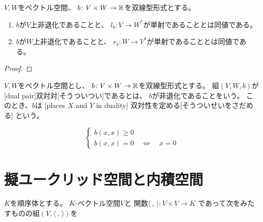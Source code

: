 \documentclass[report]{jlreq}
\begin{document}
\begin{proposition}[非退化性の特徴付け]
    $V, W$をベクトル空間、
    $b \colon V \times W \to \mathbb{R}$を双線型形式とする。
    \begin{enumerate}
        \item $b$が$V$上非退化であることと、
            $l_b \colon V \to W^*$が単射であることとは同値である。
        \item $b$が$W$上非退化であることと、
            $r_b \colon W \to V^*$が単射であることとは同値である。
    \end{enumerate}

\end{proposition}

\begin{proof}
    \TODO{}
\end{proof}

\begin{definition}[双対対]
    $V, W$をベクトル空間とし、
    $b \colon V \times W \to \mathbb{R}$を双線型形式とする。
    組$(V, W, b)$が[dual pair]{双対対}[そうついつい]であるとは、
    $b$が非退化であることをいう。
    このとき、$b$は
    [places $X$ and $Y$ in duality]
    {双対性を定める}[そうついせいをさだめる]
    という。
\end{definition}

\begin{definition}[正定値]
    \begin{equation}
        \begin{cases}
            b(x, x) \ge 0 \\
            b(x, x) = 0 \quad \iff \quad x = 0
        \end{cases}
    \end{equation}
    \TODO{}
\end{definition}



%
\section{擬ユークリッド空間と内積空間}

\begin{definition}[擬ユークリッド空間]
    $K$を順序体とする。
    $K$-ベクトル空間$V$と
    関数$\langle \, , \, \rangle \colon V \times V \to K$
    であって次をみたすものの組$(V, \langle \, , \, \rangle)$を
    \TODO{}
\end{definition}
\end{document}
